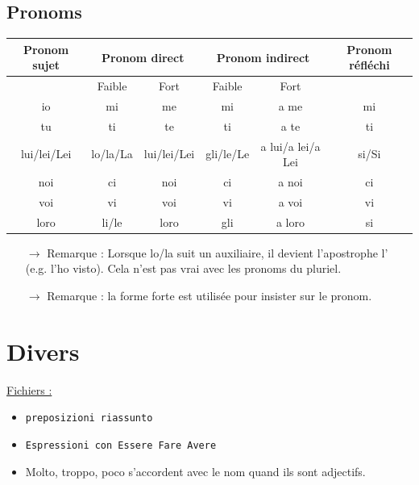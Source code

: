\documentclass[12pt, openany]{report}
\begin{document}
\section{Pronoms}
\begin{center}
    \begin{tabular}{c|c|c|c|c|c}
        Pronom sujet & \multicolumn{2}{c|}{Pronom direct} & \multicolumn{2}{c|}{Pronom indirect} & Pronom réfléchi \\ \hline 
        & Faible & Fort & Faible & Fort & \\ \hline 
        io & mi & me & mi & a me & mi\\
        tu & ti & te & ti & a te & ti\\
        lui/lei/Lei & lo/la/La & lui/lei/Lei & gli/le/Le & a lui/a lei/a Lei & si/Si\\
        noi & ci & noi & ci & a noi & ci\\
        voi & vi & voi & vi & a voi & vi\\
        loro & li/le & loro & gli & a loro & si\\
    \end{tabular}
\end{center}
\begin{itemize}
    \item [$\to$] Remarque : Lorsque lo/la suit un auxiliaire, il devient l'apostrophe l' (e.g. l'ho visto). Cela n'est pas vrai avec les pronoms du pluriel.
    \item [$\to$] Remarque : la forme forte est utilisée pour insister sur le pronom.
\end{itemize}
\chapter{Divers}
\underline{Fichiers :}
\begin{itemize}
    \item \texttt{preposizioni riassunto}
    \item \texttt{Espressioni con Essere Fare Avere}
    \item Molto, troppo, poco s'accordent avec le nom quand ils sont adjectifs. 
\end{itemize}
\end{document}
